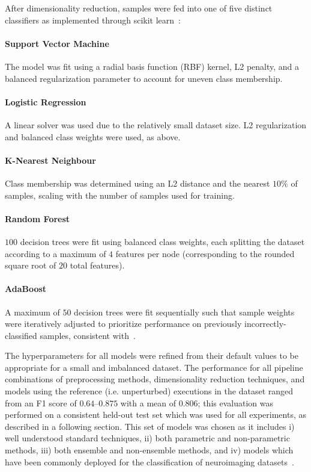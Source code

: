 \documentclass[10pt]{SelfArx} %
\begin{document}
After dimensionality reduction, samples were fed into one of five distinct classifiers as implemented through scikit
learn~\cite{Pedregosa2011-uz}:

\paragraph{Support Vector Machine} The model was fit using a radial basis function (RBF) kernel, L2 penalty, and a
balanced regularization parameter to account for uneven class membership.

\paragraph{Logistic Regression} A linear solver was used due to the relatively small dataset size. L2 regularization
and balanced class weights were used, as above.

\paragraph{K-Nearest Neighbour} Class membership was determined using an L2 distance and the nearest $10\%$ of
samples, scaling with the number of samples used for training.

\paragraph{Random Forest} $100$ decision trees were fit using balanced class weights, each splitting the dataset
according to a maximum of $4$ features per node (corresponding to the rounded square root of $20$ total features).

\paragraph{AdaBoost} A maximum of $50$ decision trees were fit sequentially such that sample weights were iteratively
adjusted to prioritize performance on previously incorrectly-classified samples, consistent with~\cite{Freund1997-qy}.

The hyperparameters for all models were refined from their default values to be appropriate for a small and imbalanced
dataset. The performance for all pipeline combinations of preprocessing methods, dimensionality reduction techniques,
and models using the reference (i.e. unperturbed) executions in the dataset ranged from an F1 score of $0.64 – 0.875$
with a mean of $0.806$; this evaluation was performed on a consistent held-out test set which was used for all
experiments, as described in a following section. This set of models was chosen as it includes i) well understood
standard techniques, ii) both parametric and non-parametric methods, iii) both ensemble and non-ensemble
methods, and iv) models which have been commonly deployed for the classification of neuroimaging
datasets~\cite{Meier2012-ve,Tunc2016-cz, Zhu2018-cs,Payabvash2019-tm,Crossley2014-tg,Park2015-uj,Nayak2016-wl,Tolan2018-nq}.
\end{document}
